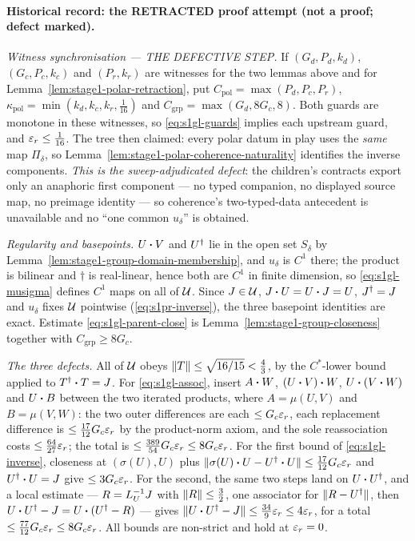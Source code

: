 \paragraph{Historical record: the RETRACTED proof attempt (not a proof; defect marked).}
\emph{Witness synchronisation --- THE DEFECTIVE STEP.} If $(G_d,P_d,k_d)$, $(G_c,P_c,k_c)$
and $(P_r,k_r)$ are witnesses for the two lemmas above and for
Lemma~\ref{lem:stage1-polar-retraction}, put $C_{\mathrm{pol}}=\max(P_d,P_c,P_r)$,
$\kappa_{\mathrm{pol}}=\min(k_d,k_c,k_r,\tfrac1{16})$ and
$C_{\mathrm{grp}}=\max(G_d,8G_c,8)$. Both guards are monotone in these witnesses, so
\eqref{eq:s1gl-guards} implies each upstream guard, and $\varepsilon_r\le\tfrac1{16}$. The tree
then claimed: every polar datum in play uses the \emph{same} map $\Pi_\delta$, so
Lemma~\ref{lem:stage1-polar-coherence-naturality} identifies the inverse components.
\emph{This is the sweep-adjudicated defect}: the children's contracts export only an
anaphoric first component --- no typed companion, no displayed source map, no preimage
identity --- so coherence's two-typed-data antecedent is unavailable and no ``one common
$u_\delta$'' is obtained.

\emph{Regularity and basepoints.} $U\mathbin{\bm{\cdot}} V$ and $U^{\dagger}$ lie in the open set $S_\delta$ by
Lemma~\ref{lem:stage1-group-domain-membership}, and $u_\delta$ is $C^{1}$ there; the product
is bilinear and $\dagger$ is real-linear, hence both are $C^{1}$ in finite dimension, so
\eqref{eq:s1gl-musigma} defines $C^{1}$ maps on all of $\mathcal U$. Since $J\in\mathcal U$,
$J\mathbin{\bm{\cdot}} U=U\mathbin{\bm{\cdot}} J=U$, $J^{\dagger}=J$ and $u_\delta$ fixes $\mathcal U$ pointwise
(\eqref{eq:s1pr-inverse}), the three basepoint identities are exact. Estimate
\eqref{eq:s1gl-parent-close} is Lemma~\ref{lem:stage1-group-closeness} together with
$C_{\mathrm{grp}}\ge8G_c$.

\emph{The three defects.} All of $\mathcal U$ obeys $\lVert T\rVert\le\sqrt{16/15}<\tfrac43$, by the
$C^*$-lower bound applied to $T^{\dagger}\mathbin{\bm{\cdot}} T=J$. For \eqref{eq:s1gl-assoc}, insert
$A\mathbin{\bm{\cdot}} W$, $(U\mathbin{\bm{\cdot}} V)\mathbin{\bm{\cdot}} W$, $U\mathbin{\bm{\cdot}}(V\mathbin{\bm{\cdot}} W)$ and $U\mathbin{\bm{\cdot}} B$ between the two iterated
products, where $A=\mu(U,V)$ and $B=\mu(V,W)$: the two outer differences are each
$\le G_c\varepsilon_r$, each replacement difference is $\le\tfrac{17}{12}G_c\varepsilon_r$ by the
product-norm axiom, and the sole reassociation costs $\le\tfrac{64}{27}\varepsilon_r$; the total is
$\le\tfrac{389}{54}G_c\varepsilon_r\le8G_c\varepsilon_r$. For the first bound of
\eqref{eq:s1gl-inverse}, closeness at $(\sigma(U),U)$ plus
$\lVert \sigma(U)\mathbin{\bm{\cdot}} U-U^{\dagger}\mathbin{\bm{\cdot}} U\rVert\le\tfrac{17}{12}G_c\varepsilon_r$ and $U^{\dagger}\mathbin{\bm{\cdot}} U=J$ give
$\le3G_c\varepsilon_r$. For the second, the same two steps land on $U\mathbin{\bm{\cdot}} U^{\dagger}$, and a local
estimate --- $R=L_{U}^{-1}J$ with $\lVert R\rVert\le\tfrac32$, one associator for
$\lVert R-U^{\dagger}\rVert$, then $U\mathbin{\bm{\cdot}} U^{\dagger}-J=U\mathbin{\bm{\cdot}}(U^{\dagger}-R)$ --- gives
$\lVert U\mathbin{\bm{\cdot}} U^{\dagger}-J\rVert\le\tfrac{34}{9}\varepsilon_r\le4\varepsilon_r$, for a total
$\le\tfrac{77}{12}G_c\varepsilon_r\le8G_c\varepsilon_r$. All bounds are non-strict and hold at
$\varepsilon_r=0$.

